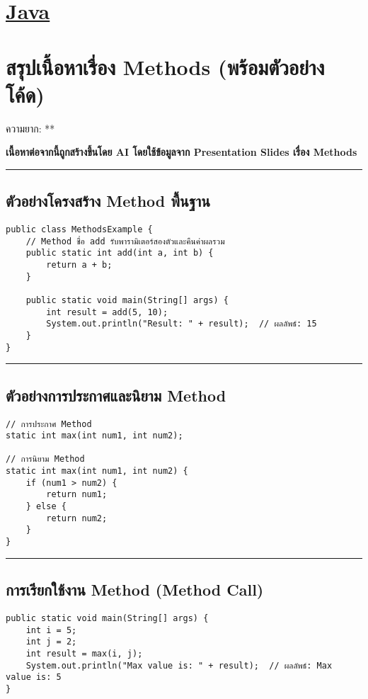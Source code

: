 \documentclass[11pt]{article}
\date{\today}
\title{}
\begin{document}
\tableofcontents

\section{\href{./index.org}{\textbf{Java}}}
\label{sec:org24f807e}
\section{สรุปเนื้อหาเรื่อง Methods (พร้อมตัวอย่างโค้ด)}
\label{sec:org434b6b8}
ความยาก: **

\textbf{เนื้อหาต่อจากนี้ถูกสร้างขึ้นโดย AI โดยใช้ข้อมูลจาก Presentation Slides เรื่อง Methods}

\noindent\rule{\textwidth}{0.5pt}
\subsection{ตัวอย่างโครงสร้าง Method พื้นฐาน}
\label{sec:org275f874}
\begin{verbatim}
public class MethodsExample {
    // Method ชื่อ add รับพารามิเตอร์สองตัวและคืนค่าผลรวม
    public static int add(int a, int b) {
        return a + b;
    }

    public static void main(String[] args) {
        int result = add(5, 10);
        System.out.println("Result: " + result);  // ผลลัพธ์: 15
    }
}
\end{verbatim}

\noindent\rule{\textwidth}{0.5pt}
\subsection{ตัวอย่างการประกาศและนิยาม Method}
\label{sec:org04eca66}
\begin{verbatim}
// การประกาศ Method
static int max(int num1, int num2);

// การนิยาม Method
static int max(int num1, int num2) {
    if (num1 > num2) {
        return num1;
    } else {
        return num2;
    }
}
\end{verbatim}

\noindent\rule{\textwidth}{0.5pt}
\subsection{การเรียกใช้งาน Method (Method Call)}
\label{sec:org9c314df}
\begin{verbatim}
public static void main(String[] args) {
    int i = 5;
    int j = 2;
    int result = max(i, j);
    System.out.println("Max value is: " + result);  // ผลลัพธ์: Max value is: 5
}
\end{verbatim}
\end{document}
